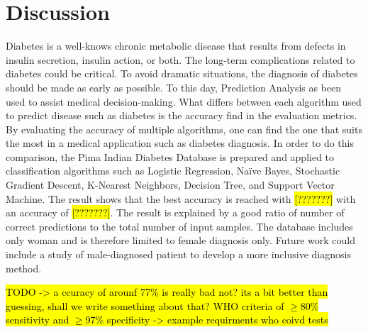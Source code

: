 \documentclass[11pt]{article}
\begin{document}
	\section{Discussion}
	Diabetes is a well-knows chronic metabolic disease that results from defects in insulin secretion, insulin action, or both. The long-term complications related to diabetes could be critical. To avoid dramatic situations, the diagnosis of diabetes should be made as early as possible. To this day, Prediction Analysis as been used to assist medical decision-making. What differs between each algorithm used to predict disease such as diabetes is the accuracy find in the evaluation metrics. By evaluating the accuracy of multiple algorithms, one can find the one that suits the most in a medical application such as diabetes diagnosis. In order to do this comparison, the Pima Indian Diabetes Database is prepared and applied to classification algorithms such as Logistic Regression, Naïve Bayes, Stochastic Gradient Descent, K-Nearest Neighbors, Decision Tree, and Support Vector Machine. The result shows that the best accuracy is reached with \hl{[???????]} with an accuracy of \hl{[???????]}. The result is explained by a good ratio of number of correct predictions to the total number of input samples. The database includes only woman and is therefore limited to female diagnosis only. Future work could include a study of male-diagnosed patient to develop a more inclusive diagnosis method.

	\hl{TODO -> a ccuracy of arounf 77\% is really bad not? its a bit better than guessing, shall we write something about that? WHO criteria of $\geq$80\% sensitivity and $\geq$97\% specificity -> example requirments who coivd tests}
\printbibliography
\end{document}
